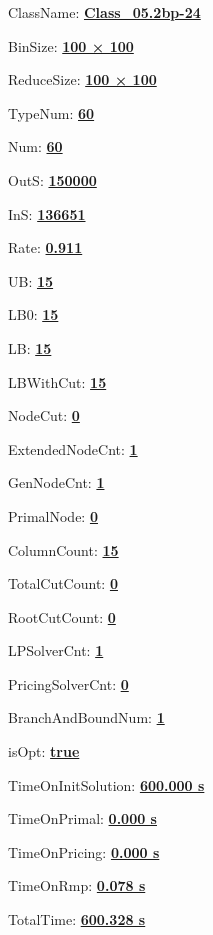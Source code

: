 \documentclass[11pt]{article}
\begin{document}
\pagestyle{empty}


ClassName: \underline{\textbf{Class_05.2bp-24}}
\par
BinSize: \underline{\textbf{100 × 100}}
\par
ReduceSize: \underline{\textbf{100 × 100}}
\par
TypeNum: \underline{\textbf{60}}
\par
Num: \underline{\textbf{60}}
\par
OutS: \underline{\textbf{150000}}
\par
InS: \underline{\textbf{136651}}
\par
Rate: \underline{\textbf{0.911}}
\par
UB: \underline{\textbf{15}}
\par
LB0: \underline{\textbf{15}}
\par
LB: \underline{\textbf{15}}
\par
LBWithCut: \underline{\textbf{15}}
\par
NodeCut: \underline{\textbf{0}}
\par
ExtendedNodeCnt: \underline{\textbf{1}}
\par
GenNodeCnt: \underline{\textbf{1}}
\par
PrimalNode: \underline{\textbf{0}}
\par
ColumnCount: \underline{\textbf{15}}
\par
TotalCutCount: \underline{\textbf{0}}
\par
RootCutCount: \underline{\textbf{0}}
\par
LPSolverCnt: \underline{\textbf{1}}
\par
PricingSolverCnt: \underline{\textbf{0}}
\par
BranchAndBoundNum: \underline{\textbf{1}}
\par
isOpt: \underline{\textbf{true}}
\par
TimeOnInitSolution: \underline{\textbf{600.000 s}}
\par
TimeOnPrimal: \underline{\textbf{0.000 s}}
\par
TimeOnPricing: \underline{\textbf{0.000 s}}
\par
TimeOnRmp: \underline{\textbf{0.078 s}}
\par
TotalTime: \underline{\textbf{600.328 s}}
\par
\newpage


\end{document}
